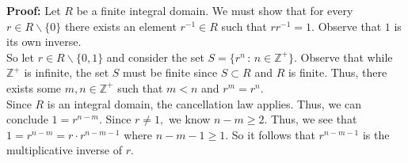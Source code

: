 \documentclass[12pt]{article}
\newcommand{\bbZ}{\mathbb{Z}}
\begin{document}
\textbf{Proof:} Let $R$ be a finite integral domain. We must show that for every $r \in R\backslash \{0\}$ there exists an element $r^{-1} \in R$ such that $rr^{-1}=1.$ Observe that $1$ is its own inverse.\\
So let $r \in R\backslash\{0,1\}$ and consider the set $S=\{r^n\, : \, n \in \bbZ^+\}.$  Observe that while $\bbZ^+$ is infinite, the set $S$ must be finite since $S \subset R$ and $R$ is finite. Thus, there exists some $m,n \in \bbZ^+$ such that $m<n$ and $r^m=r^n.$ \\
Since $R$ is an integral domain, the cancellation law applies. Thus, we can conclude $1=r^{n-m}.$ Since $r \not =1,$ we know $n-m\geq 2.$ Thus, we see that $1=r^{n-m}=r\cdot r^{n-m-1}$ where $n-m-1\geq 1.$ So it follows that $r^{n-m-1}$ is the multiplicative inverse of $r$.
\vfill
\end{document}
